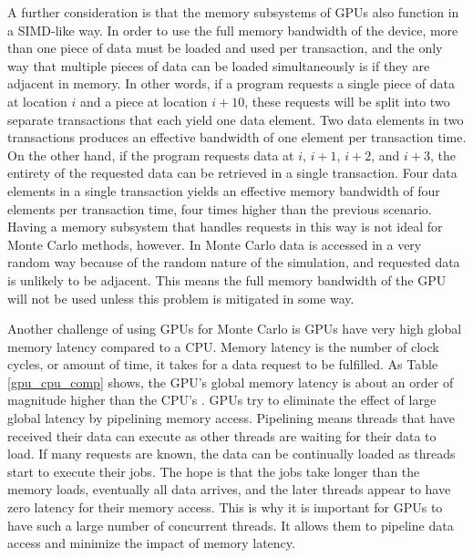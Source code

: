 \documentclass[preprint,12pt]{elsarticle}
\begin{document}
A further consideration is that the memory subsystems of GPUs also function in a SIMD-like way.  In order to use the full memory bandwidth of the device, more than one piece of data must be loaded and used per transaction, and the only way that multiple pieces of data can be loaded simultaneously is if they are adjacent in memory.  In other words, if a program requests a single piece of data at location $i$ and a piece at location $i+10$, these requests will be split into two separate transactions that each yield one data element.
  Two data elements in two transactions produces an effective bandwidth of one element per transaction time. 
On the other hand, if the program requests data at $i$, $i+1$, $i+2$, and $i+3$, the entirety of the requested data can be retrieved in a single transaction.  Four data elements in a single transaction yields an effective memory bandwidth of four elements per transaction time, four times higher than the previous scenario.  Having a memory subsystem that handles requests in this way is not ideal for Monte Carlo methods, however.  In Monte Carlo data is accessed in a very random way because of the random nature of the simulation, and requested data is unlikely to be adjacent.  This means the full memory bandwidth of the GPU will not be used unless this problem is mitigated in some way.

Another challenge of using GPUs for Monte Carlo is GPUs have very high global memory latency compared to a CPU.  Memory latency is the number of clock cycles, or amount of time, it takes for a data request to be fulfilled.  As Table \ref{gpu_cpu_comp} shows, the GPU's global memory latency is about an order of magnitude higher than the CPU's \cite{cpu_latency,cuda}.  
GPUs try to eliminate the effect of large global latency by pipelining memory access.  Pipelining means threads that have received their data can execute as other threads are waiting for their data to load.  If many requests are known, the data can be continually loaded as threads start to execute their jobs.  The hope is that the jobs take longer than the memory loads, eventually all data arrives, and the later threads appear to have zero latency for their memory access.  This is why it is important for GPUs to have such a large number of concurrent threads.  It allows them to pipeline data access and minimize the impact of memory latency.
\end{document}
